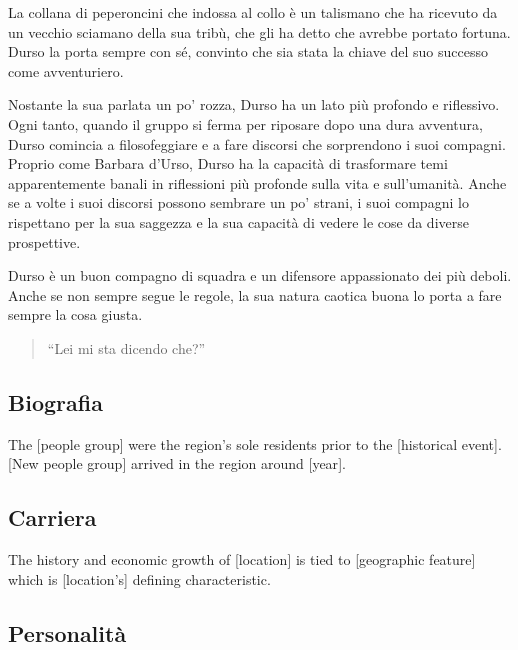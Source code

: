 La collana di peperoncini che indossa al collo è un talismano che ha
ricevuto da un vecchio sciamano della sua tribù, che gli ha detto che
avrebbe portato fortuna. Durso la porta sempre con sé, convinto che sia
stata la chiave del suo successo come avventuriero.

Nostante la sua parlata un po' rozza, Durso ha un lato più profondo e
riflessivo. Ogni tanto, quando il gruppo si ferma per riposare dopo una
dura avventura, Durso comincia a filosofeggiare e a fare discorsi che
sorprendono i suoi compagni. Proprio come Barbara d'Urso, Durso ha la
capacità di trasformare temi apparentemente banali in riflessioni più
profonde sulla vita e sull'umanità. Anche se a volte i suoi discorsi
possono sembrare un po' strani, i suoi compagni lo rispettano per la sua
saggezza e la sua capacità di vedere le cose da diverse prospettive.

Durso è un buon compagno di squadra e un difensore appassionato dei più
deboli. Anche se non sempre segue le regole, la sua natura caotica buona
lo porta a fare sempre la cosa giusta.

\begin{quote}
``Lei mi sta dicendo che?''
\end{quote}

\subsection{Biografia}\label{biografia}



The {[}people group{]} were the region's sole residents prior to the
{[}historical event{]}. {[}New people group{]} arrived in the region
around {[}year{]}.

\subsection{Carriera}\label{carriera}


The history and economic growth of {[}location{]} is tied to
{[}geographic feature{]} which is {[}location's{]} defining
characteristic.

\subsection{Personalità}\label{personalituxe0}


